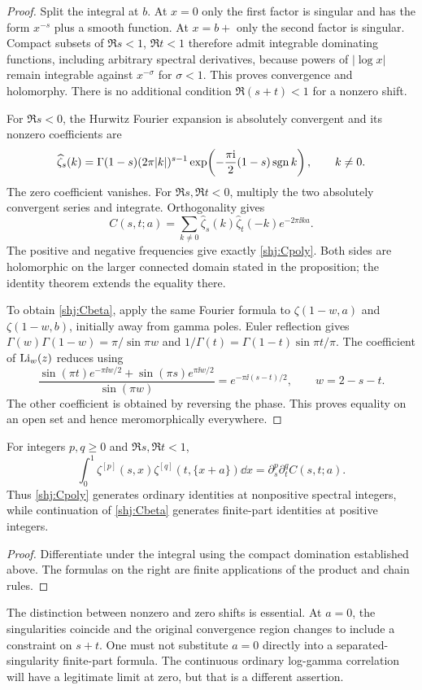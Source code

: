 \begin{proof}
Split the integral at $b$. At $x=0$ only the first factor is singular and has the form $x^{-s}$ plus a smooth function. At $x=b+$ only the second factor is singular. Compact subsets of $\Re s<1$, $\Re t<1$ therefore admit integrable dominating functions, including arbitrary spectral derivatives, because powers of $|\log x|$ remain integrable against $x^{-\sigma}$ for $\sigma<1$. This proves convergence and holomorphy. There is no additional condition $\Re(s+t)<1$ for a nonzero shift.

For $\Re s<0$, the Hurwitz Fourier expansion \cite[Eq.~25.11.9]{shj:DLMF25} is absolutely convergent and its nonzero coefficients are
\begin{equation}\label{shj:fouriercoef}
\widehat\zeta_s(k)=\Gamma(1-s)(2\pi|k|)^{s-1}
\exp\!\left(-\frac{\pi\mathrm{i}}{2}(1-s)\operatorname{sgn} k\right),\qquad k\ne0.
\end{equation}
The zero coefficient vanishes. For $\Re s,\Re t<0$, multiply the two absolutely convergent series and integrate. Orthogonality gives
\[
C(s,t;a)=\sum_{k\ne0}\widehat\zeta_s(k)\widehat\zeta_t(-k)e^{-2\pi\ii ka}.
\]
The positive and negative frequencies give exactly \eqref{shj:Cpoly}. Both sides are holomorphic on the larger connected domain stated in the proposition; the identity theorem extends the equality there.

To obtain \eqref{shj:Cbeta}, apply the same Fourier formula to $\zeta(1-w,a)$ and $\zeta(1-w,b)$, initially away from gamma poles. Euler reflection gives
$\Gamma(w)\Gamma(1-w)=\pi/\sin\pi w$ and
$1/\Gamma(t)=\Gamma(1-t)\sin\pi t/\pi$.
The coefficient of $\operatorname{Li}_w(z)$ reduces using
\[
\frac{\sin(\pi t)e^{-\pi\ii w/2}+\sin(\pi s)e^{\pi\ii w/2}}
{\sin(\pi w)}=e^{-\pi\ii(s-t)/2},\qquad w=2-s-t.
\]
The other coefficient is obtained by reversing the phase. This proves equality on an open set and hence meromorphically everywhere.
\end{proof}

\begin{corollary}\label{shj:ordinaryjets}
For integers $p,q\ge0$ and $\Re s,\Re t<1$,
\[
\int_0^1\zeta^{[p]}(s,x)\zeta^{[q]}(t,\{x+a\})\dd x
=\partial_s^p\partial_t^q C(s,t;a).
\]
Thus \eqref{shj:Cpoly} generates ordinary identities at nonpositive spectral integers, while continuation of \eqref{shj:Cbeta} generates finite-part identities at positive integers.
\end{corollary}
\begin{proof}
Differentiate under the integral using the compact domination established above. The formulas on the right are finite applications of the product and chain rules.
\end{proof}
The distinction between nonzero and zero shifts is essential. At $a=0$, the singularities coincide and the original convergence region changes to include a constraint on $s+t$. One must not substitute $a=0$ directly into a separated-singularity finite-part formula. The continuous ordinary log-gamma correlation will have a legitimate limit at zero, but that is a different assertion.

